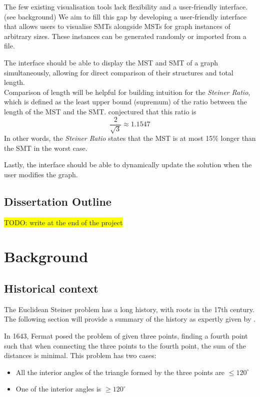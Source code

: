 \documentclass{l4proj}
\begin{document}
The few existing visualisation tools lack flexibility and a user-friendly interface. (see background)
We aim to fill this gap by developing a user-friendly interface that allows users to visualise SMTs alongside MSTs for graph instances of arbitrary sizes. These instances can be generated randomly or imported from a file.

The interface should be able to display the MST and SMT of a graph simultaneously, allowing for direct comparison of their structures and total length.
\\
Comparison of length will be helpful for building intuition for the \textit{Steiner Ratio},  which is defined as the least upper bound (supremum) of the ratio between the length of the MST and the SMT.  \cite{Gilbert1968SteinerMT} conjectured that this ratio is $$\frac{2}{\sqrt{3}} \approx 1.1547$$
In other words, the \textit{Steiner Ratio} states that the MST is at most 15\% longer than the SMT in the worst case.

Lastly, the interface should be able to dynamically update the solution when the user modifies the graph.

\section{Dissertation Outline}

\colorbox{yellow}{TODO: write at the end of the project}





\chapter{Background}

\section{Historical context}
The Euclidean Steiner problem has a long history, with roots in the 17th century. The following section will provide a summary of the history as expertly given by \cite{Brazil2014}.

In 1643, Fermat posed the problem of given three points, finding a fourth point such that when connecting the three points to the fourth point, the sum of the distances is minimal. This problem has two cases:
\begin{itemize}
      \item All the interior angles of the triangle formed by the three points are $\le 120^\circ$
      \item One of the interior angles is $\geq 120^\circ$
\end{itemize}
\end{document}
